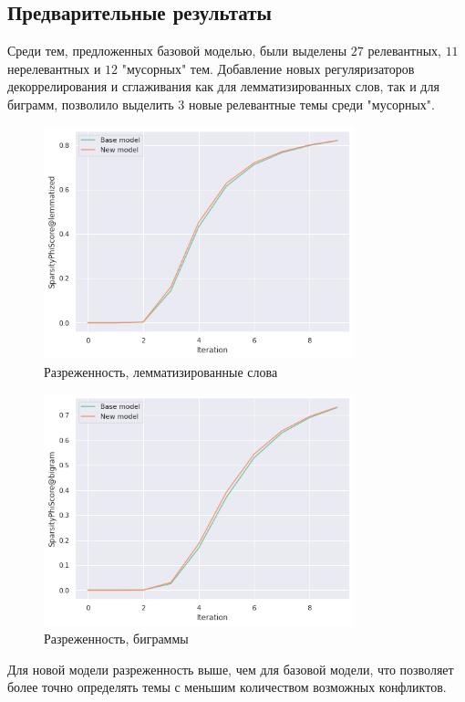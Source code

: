 \documentclass{article}
\begin{document}

\subsection{Предварительные результаты}

Среди тем, предложенных базовой моделью, были выделены $27$ релевантных, $11$ нерелевантных и $12$ "мусорных" тем.
Добавление новых регуляризаторов декоррелирования и сглаживания как для лемматизированных слов, так и для биграмм, позволило выделить $3$ новые релевантные темы среди "мусорных".

\begin{figure}[h]
\includegraphics[width=9cm]{figures/sparsity_lemmatized.png}
\centering
\caption{Разреженность, лемматизированные слова}
\end{figure}

\begin{figure}[h]
\includegraphics[width=9cm]
{figures/sparsity_bigram.png}
\centering
\caption{Разреженность, биграммы}
\end{figure}

Для новой модели разреженность выше, чем для базовой модели, что позволяет более точно определять темы с меньшим количеством возможных конфликтов.



\end{document}
